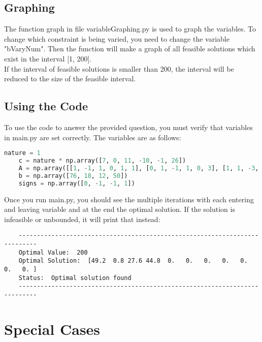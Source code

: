 \documentclass{article}
\numberwithin{equation}{section}
\begin{document}
\subsection{Graphing}
The function graph in file variableGraphing.py is used to graph the variables. To change which constraint is being varied, you need to change the variable "bVaryNum". Then the function will make a graph of all feasible solutions which exist in the interval [1, 200].\\
If the interval of feasible solutions is smaller than 200, the interval will be reduced to the size of the feasible interval.

\subsection{Using the Code}
To use the code to answer the provided question, you must verify that variables in main.py are set correctly. The variables are as follows:
\begin{lstlisting}[language=Python, basicstyle=\scriptsize, frame=single]
    nature = 1
    c = nature * np.array([7, 0, 11, -10, -1, 26])
    A = np.array([[1, -1, 1, 0, 1, 1], [0, 1, -1, 1, 0, 3], [1, 1, -3, 1, 1, 0], [1, 1, 0, 0, 0, 1]])
    b = np.array([76, 18, 12, 50])
    signs = np.array([0, -1, -1, 1])
\end{lstlisting}
Once you run main.py, you should see the multiple iterations with each entering and leaving variable and at the end the optimal solution. If the solution is infeasible or unbounded, it will print that instead:
\begin{lstlisting}
    ---------------------------------------------------------------------------
    Optimal Value:  200
    Optimal Solution:  [49.2  0.8 27.6 44.8  0.   0.   0.   0.   0.   0.   0. ]
    Status:  Optimal solution found
    ---------------------------------------------------------------------------
\end{lstlisting}

\newpage
\section{Special Cases}
\end{document}
